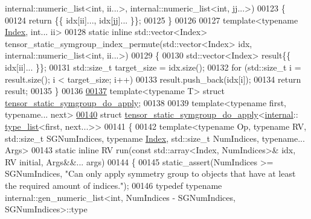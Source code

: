 \begin{DoxyCode}
       internal::numeric\_list<int, ii...>, internal::numeric\_list<int, jj...>)
00123 \{
00124   \textcolor{keywordflow}{return} \{\{ idx[ii]..., idx[jj]... \}\};
00125 \}
00126 
00127 \textcolor{keyword}{template}<\textcolor{keyword}{typename} \hyperlink{namespace_eigen_a62e77e0933482dafde8fe197d9a2cfde}{Index}, \textcolor{keywordtype}{int}... ii>
00128 \textcolor{keyword}{static} \textcolor{keyword}{inline} std::vector<Index> tensor\_static\_symgroup\_index\_permute(std::vector<Index> idx, 
      internal::numeric\_list<int, ii...>)
00129 \{
00130   std::vector<Index> result\{\{ idx[ii]... \}\};
00131   std::size\_t target\_size = idx.size();
00132   \textcolor{keywordflow}{for} (std::size\_t i = result.size(); i < target\_size; i++)
00133     result.push\_back(idx[i]);
00134   \textcolor{keywordflow}{return} result;
00135 \}
00136 
\hyperlink{struct_eigen_1_1internal_1_1tensor__static__symgroup__do__apply}{00137} \textcolor{keyword}{template}<\textcolor{keyword}{typename} T> \textcolor{keyword}{struct }\hyperlink{struct_eigen_1_1internal_1_1tensor__static__symgroup__do__apply}{tensor\_static\_symgroup\_do\_apply};
00138 
00139 \textcolor{keyword}{template}<\textcolor{keyword}{typename} first, \textcolor{keyword}{typename}... next>
\hyperlink{struct_eigen_1_1internal_1_1tensor__static__symgroup__do__apply_3_01internal_1_1type__list_3_01first_00_01next_8_8_8_01_4_01_4}{00140} \textcolor{keyword}{struct }\hyperlink{struct_eigen_1_1internal_1_1tensor__static__symgroup__do__apply}{tensor\_static\_symgroup\_do\_apply}<\hyperlink{namespaceinternal}{internal}::
      \hyperlink{struct_eigen_1_1internal_1_1type__list}{type\_list}<first, next...>>
00141 \{
00142   \textcolor{keyword}{template}<\textcolor{keyword}{typename} Op, \textcolor{keyword}{typename} RV, std::size\_t SGNumIndices, \textcolor{keyword}{typename} \hyperlink{namespace_eigen_a62e77e0933482dafde8fe197d9a2cfde}{Index}, std::size\_t NumIndices,
       \textcolor{keyword}{typename}... Args>
00143   \textcolor{keyword}{static} \textcolor{keyword}{inline} RV run(\textcolor{keyword}{const} std::array<Index, NumIndices>& idx, RV initial, Args&&... args)
00144   \{
00145     static\_assert(NumIndices >= SGNumIndices, \textcolor{stringliteral}{"Can only apply symmetry group to objects that have at least
       the required amount of indices."});
00146     \textcolor{keyword}{typedef} \textcolor{keyword}{typename} internal::gen\_numeric\_list<int, NumIndices - SGNumIndices, SGNumIndices>::type 

\end{DoxyCode}
